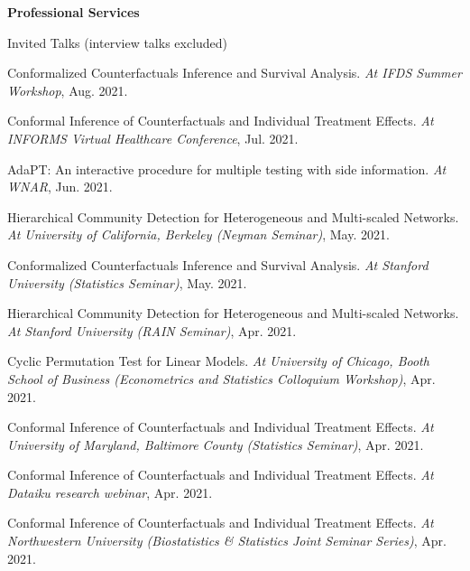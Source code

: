 \documentclass{article}
\begin{document}
\vspace{2mm}
\begin{large}
\noindent \textbf{Professional Services}
\end{large}
\vspace{5mm}

\begin{large}
\noindent Invited Talks (interview talks excluded)
\end{large}

\vspace{2mm}
Conformalized Counterfactuals Inference and Survival Analysis. \emph{At IFDS Summer Workshop}, Aug. 2021.

\vspace{2mm}
Conformal Inference of Counterfactuals and Individual Treatment Effects. \emph{At INFORMS Virtual Healthcare Conference}, Jul. 2021.

\vspace{2mm}
AdaPT: An interactive procedure for multiple testing with side information. \emph{At WNAR}, Jun. 2021.

\vspace{2mm}
Hierarchical Community Detection for Heterogeneous and Multi-scaled Networks. \emph{At University of California, Berkeley (Neyman Seminar)}, May. 2021.

\vspace{2mm}
Conformalized Counterfactuals Inference and Survival Analysis. \emph{At Stanford University (Statistics Seminar)}, May. 2021.

\vspace{2mm}
Hierarchical Community Detection for Heterogeneous and Multi-scaled Networks. \emph{At Stanford University (RAIN Seminar)}, Apr. 2021.

\vspace{2mm}
Cyclic Permutation Test for Linear Models. \emph{At University of Chicago, Booth School of Business (Econometrics and Statistics Colloquium Workshop)}, Apr. 2021.

\vspace{2mm}
Conformal Inference of Counterfactuals and Individual Treatment Effects. \emph{At University of Maryland, Baltimore County (Statistics Seminar)}, Apr. 2021.

\vspace{2mm}
Conformal Inference of Counterfactuals and Individual Treatment Effects. \emph{At Dataiku research webinar}, Apr. 2021.

\vspace{2mm}
Conformal Inference of Counterfactuals and Individual Treatment Effects. \emph{At Northwestern University (Biostatistics \& Statistics Joint Seminar Series)}, Apr. 2021.
\end{document}
